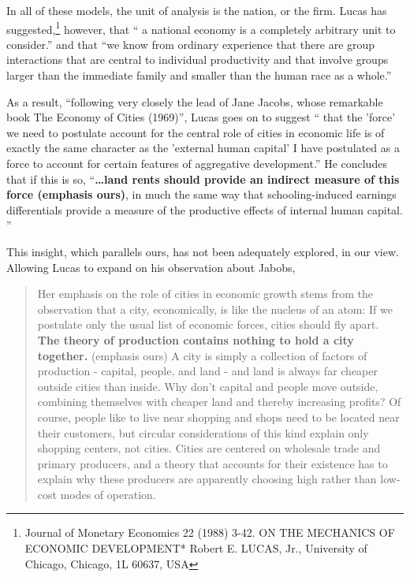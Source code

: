In all of these models, the unit of analysis is the nation,  or the firm. Lucas has suggested,\footnote{Journal of Monetary Economics 22 (1988) 3-42.  ON THE MECHANICS OF ECONOMIC DEVELOPMENT*
Robert E. LUCAS, Jr., University of Chicago, Chicago, 1L 60637, USA}
however, that `` a national economy is a completely arbitrary unit to consider.'' and that ``we know from ordinary experience that there are group interactions that are central to individual productivity and that involve groups larger than the immediate family and smaller than the human race as a whole.''  

As a result, ``following very closely the lead of Jane Jacobs, whose remarkable book The Economy of Cities (1969)'', Lucas goes on to suggest `` that the 'force' we need to postulate account for the central role of cities in economic life is of exactly the same character as the 'external human capital' I have postulated as a force to account for certain features of aggregative development.''  He concludes that if this is so, ``\textbf{\dots land rents should provide an indirect measure of this force (emphasis  ours)}, in much the same way that schooling-induced earnings differentials provide a measure of the productive effects of internal human capital. ''

This insight, which parallels ours, has not been adequately explored, in our view.  Allowing Lucas to expand on his observation about Jabobs, 



\begin{quotation}
    Her emphasis on the role of cities in economic growth stems from the observation that a city, economically, is like the nucleus of an atom: If we postulate only the usual list of economic forces, cities should fly apart. \textbf{The theory of production contains nothing to hold a city together.} (emphasis ours) A city is simply a collection of factors of production - capital, people, and land - and land is always far cheaper outside cities than inside. Why don't capital and people move outside, combining themselves with cheaper land and thereby increasing profits? Of course, people like to live near shopping and shops need to be located near their customers, but circular considerations of this kind explain only shopping centers, not cities. Cities are centered on wholesale trade and primary producers, and a theory that accounts for their existence has to explain why these producers are apparently choosing high rather than low-cost modes of operation.
\end{quotation}

